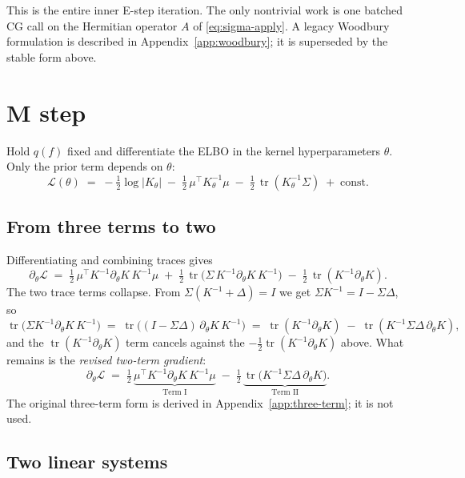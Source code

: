\documentclass{article}
\DeclareMathOperator{\tr}{tr}
\begin{document}
This is the entire inner E-step iteration. The only nontrivial work is one batched CG call on the Hermitian operator $A$ of \eqref{eq:sigma-apply}. A legacy Woodbury formulation is described in Appendix~\ref{app:woodbury}; it is superseded by the stable form above.

\section{M step}
\label{sec:mstep}

Hold $q(f)$ fixed and differentiate the ELBO in the kernel hyperparameters $\theta$. Only the prior term depends on $\theta$:
\[
  \mathcal{L}(\theta) \;=\;
  -\tfrac12\log|K_\theta|
  \;-\;\tfrac12\,\mu^{\top}K_\theta^{-1}\mu
  \;-\;\tfrac12\,\tr(K_\theta^{-1}\Sigma)
  \;+\;\text{const}.
\]

\subsection{From three terms to two}
\label{sec:revised-mstep}
Differentiating and combining traces gives
\[
  \partial_\theta\mathcal{L}
  \;=\;
  \tfrac12\,\mu^{\top}K^{-1}\partial_\theta K\,K^{-1}\mu
  \;+\;\tfrac12\,\tr\!\bigl(\Sigma\,K^{-1}\partial_\theta K\,K^{-1}\bigr)
  \;-\;\tfrac12\,\tr(K^{-1}\partial_\theta K).
\]
The two trace terms collapse. From $\Sigma(K^{-1}+\Delta)=I$ we get $\Sigma K^{-1}=I-\Sigma\Delta$, so
\[
  \tr\!\bigl(\Sigma K^{-1}\partial_\theta K\,K^{-1}\bigr)
  \;=\;
  \tr\!\bigl((I-\Sigma\Delta)\,\partial_\theta K\,K^{-1}\bigr)
  \;=\;
  \tr(K^{-1}\partial_\theta K)
  \;-\;
  \tr(K^{-1}\Sigma\Delta\,\partial_\theta K),
\]
and the $\tr(K^{-1}\partial_\theta K)$ term cancels against the $-\tfrac12\tr(K^{-1}\partial_\theta K)$ above. What remains is the \emph{revised two-term gradient}:
\begin{equation}
\boxed{\;
  \partial_\theta\mathcal{L}
  \;=\;
  \tfrac12\,\underbrace{\mu^{\top}K^{-1}\partial_\theta K\,K^{-1}\mu}_{\text{Term I}}
  \;-\;
  \tfrac12\,\underbrace{\tr\!\bigl(K^{-1}\Sigma\Delta\,\partial_\theta K\bigr)}_{\text{Term II}}.
\;}
\label{eq:mstep-grad}
\end{equation}
The original three-term form is derived in Appendix~\ref{app:three-term}; it is not used.

\subsection{Two linear systems}
\label{sec:mstep-two-systems}
\end{document}

